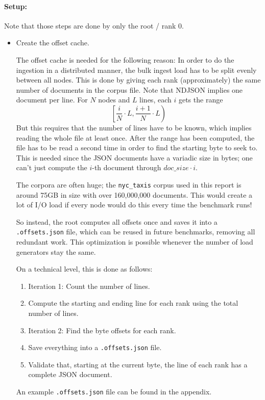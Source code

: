 \paragraph{Setup:}
Note that those steps are done by only the root / rank 0.
\begin{itemize}
  \item Create the offset cache.

    The offset cache is needed for the following reason: In order to do the ingestion in a distributed manner, the bulk ingest load has to be split evenly between all nodes. This is done by giving each rank (approximately) the same number of documents in the corpus file. Note that \ac{NDJSON} implies one document per line. For $N$ nodes and $L$ lines, each $i$ gets the range
    \[
      \left[ \frac{i}{N} \cdot L, \frac{i+1}{N} \cdot L \right)
    \]
    But this requires that the number of lines have to be known, which implies reading the whole file at least once. After the range has been computed, the file has to be read a second time in order to find the starting byte to seek to. This is needed since the \ac{JSON} documents have a variadic size in bytes; one can't just compute the $i$-th document through $doc\_size \cdot i$.

    The corpora are often huge; the \texttt{nyc\_taxis} corpus used in this report is around 75GB in size with over 160,000,000 documents. This would create a lot of I/O load if every node would do this every time the benchmark runs! 

    So instead, the root computes all offsets once and saves it into a \texttt{.offsets.json} file, which can be reused in future benchmarks, removing all redundant work. This optimization is possible whenever the number of load generators stay the same.

    On a technical level, this is done as follows:
    \begin{enumerate}
      \item Iteration 1: Count the number of lines.
      \item Compute the starting and ending line for each rank using the total number of lines.
      \item Iteration 2: Find the byte offsets for each rank.
      \item Save everything into a \texttt{.offsets.json} file.
      \item Validate that, starting at the current byte, the line of each rank has a complete \ac{JSON} document.
    \end{enumerate}
    An example \texttt{.offsets.json} file can be found in the appendix.


\end{itemize}
